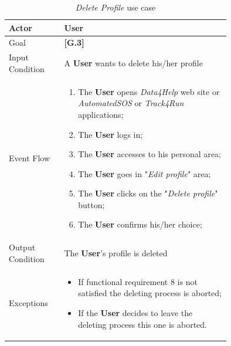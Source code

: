\begin{center}
\begin{table}[H]
\begin{tabular}{ | l | p{0.75\linewidth} | }
  \hline
    Actor & \textbf{User} \\ \hline
    Goal & \textbf{[G.3]} \\ \hline
    Input Condition & A \textbf{User} wants to delete his/her profile\\ \hline
    Event Flow & \begin{minipage}[t]{0.7\textwidth}
      \begin{enumerate}
        \item The \textbf{User} opens \textit{Data4Help} web site or \textit{AutomatedSOS} or \textit{Track4Run} applications;
        \item The \textbf{User} logs in;
        \item The \textbf{User} accesses to his personal area;
        \item The \textbf{User} goes in "\textit{Edit profile}" area;
        \item The \textbf{User} clicks on the "\textit{Delete profile}" button;
        \item The \textbf{User} confirms his/her choice;
      \end{enumerate}
    \smallskip
  \end{minipage} \\ \hline
  Output Condition & The \textbf{User}'s  profile is deleted\\ \hline
  Exceptions & \begin{minipage}[t]{0.7\textwidth}
    \begin{itemize}
      \smallskip
      \item If functional requirement 8 is not satisfied the deleting process is aborted;
      \item If the \textbf{User} decides to leave the deleting process this one is aborted.
    \end{itemize}
    \smallskip
  \end{minipage}  \\ \hline
\end{tabular}
\caption{\textit{Delete Profile} use case}
\label{table:deleteProfileTable}
\end{table}
\end{center}

